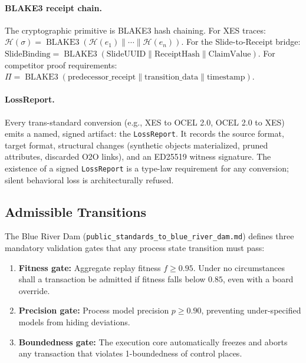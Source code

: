 \paragraph{BLAKE3 receipt chain.}
The cryptographic primitive is BLAKE3 hash chaining. For XES traces:
$\mathcal{H}(\sigma) = \operatorname{BLAKE3}(\mathcal{H}(e_1) \parallel \cdots \parallel
\mathcal{H}(e_n))$. For the Slide-to-Receipt bridge:
$\text{SlideBinding} = \operatorname{BLAKE3}(\text{SlideUUID} \parallel \text{ReceiptHash}
\parallel \text{ClaimValue})$. For competitor proof requirements:
$\Pi = \operatorname{BLAKE3}(\text{predecessor\_receipt} \parallel \text{transition\_data}
\parallel \text{timestamp})$.

\paragraph{LossReport.}
Every trans-standard conversion (e.g., XES to OCEL 2.0, OCEL 2.0 to XES) emits a named,
signed artifact: the \texttt{LossReport}. It records the source format, target format,
structural changes (synthetic objects materialized, pruned attributes, discarded O2O
links), and an ED25519 witness signature. The existence of a signed \texttt{LossReport}
is a type-law requirement for any conversion; silent behavioral loss is architecturally
refused.

\subsection{Admissible Transitions}
\label{sec:standards-arch-transitions}

The Blue River Dam (\texttt{public\_standards\_to\_blue\_river\_dam.md}) defines three
mandatory validation gates that any process state transition must pass:

\begin{enumerate}
  \item \textbf{Fitness gate:} Aggregate replay fitness $f \ge 0.95$. Under no
        circumstances shall a transaction be admitted if fitness falls below $0.85$,
        even with a board override.
  \item \textbf{Precision gate:} Process model precision $p \ge 0.90$, preventing
        under-specified models from hiding deviations.
  \item \textbf{Boundedness gate:} The execution core automatically freezes and aborts
        any transaction that violates 1-boundedness of control places.
\end{enumerate}

